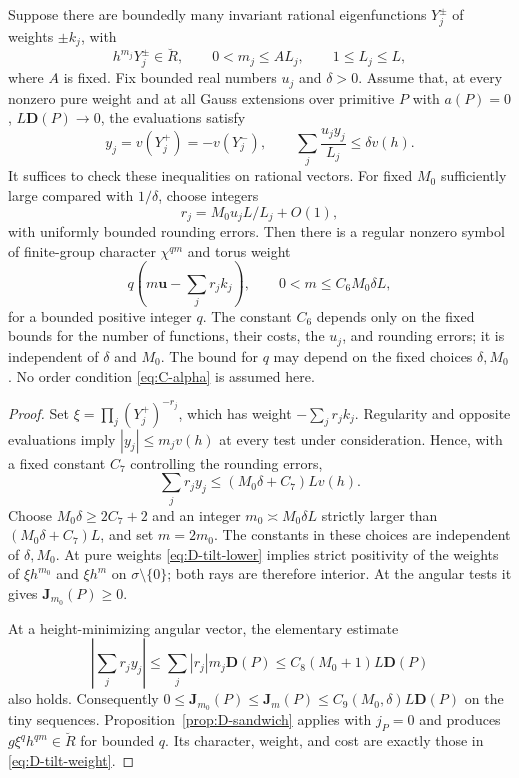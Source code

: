 \begin{corollary}
\label{cor:D-tilted-characters}
Suppose there are boundedly many invariant rational eigenfunctions
$Y_j^\pm$ of weights $\pm k_j$, with
\[
 h^{m_j}Y_j^\pm\in\breve R,\qquad
 0<m_j\le A L_j,\qquad 1\le L_j\le L,
\]
where $A$ is fixed.  Fix bounded real numbers $u_j$ and $\delta>0$.
Assume that, at every nonzero pure weight and at all Gauss extensions
over primitive $P$ with $a(P)=0$, $L\mathbf D(P)\to0$, the evaluations
satisfy
\begin{equation}\label{eq:D-tilt-hypothesis}
 y_j=v(Y_j^+)=-v(Y_j^-),\qquad
 \sum_j\frac{u_jy_j}{L_j}\le\delta v(h).
\end{equation}
It suffices to check these inequalities on rational vectors.  For
fixed $M_0$ sufficiently large compared with $1/\delta$, choose integers
\[
 r_j=M_0u_jL/L_j+O(1),
\]
with uniformly bounded rounding errors.  Then there is a regular
nonzero symbol of finite-group character $\chi^{qm}$ and torus weight
\begin{equation}\label{eq:D-tilt-weight}
 q\left(m\mathbf u-\sum_jr_jk_j\right),
 \qquad 0<m\le C_6M_0\delta L,
\end{equation}
for a bounded positive integer $q$.  The constant $C_6$ depends only on
the fixed bounds for the number of functions, their costs, the $u_j$,
and rounding errors; it is independent of $\delta$ and $M_0$.
The bound for $q$ may depend on the fixed choices $\delta,M_0$.
No order condition \eqref{eq:C-alpha} is assumed here.
\end{corollary}

\begin{proof}
Set $\xi=\prod_j(Y_j^+)^{-r_j}$, which has weight
$-\sum_jr_jk_j$.  Regularity and opposite evaluations imply
$|y_j|\le m_jv(h)$ at every test under consideration.  Hence, with a
fixed constant $C_7$ controlling the rounding errors,
\begin{equation}\label{eq:D-tilt-lower}
 \sum_jr_jy_j
 \le(M_0\delta+C_7)Lv(h).
\end{equation}
Choose $M_0\delta\ge2C_7+2$ and an integer
$m_0\asymp M_0\delta L$ strictly larger than
$(M_0\delta+C_7)L$, and set $m=2m_0$.  The constants in these choices
are independent of $\delta,M_0$.  At pure weights
\eqref{eq:D-tilt-lower} implies strict positivity of the weights of
$\xi h^{m_0}$ and $\xi h^m$ on $\sigma\setminus\{0\}$; both rays
are therefore interior.  At the angular tests it gives
$\mathbf J_{m_0}(P)\ge0$.

At a height-minimizing angular vector, the elementary estimate
\[
 \left|\sum_jr_jy_j\right|
 \le\sum_j|r_j|m_j\mathbf D(P)
 \le C_8(M_0+1)L\mathbf D(P)
\]
also holds.  Consequently
$0\le\mathbf J_{m_0}(P)\le\mathbf J_m(P)
\le C_9(M_0,\delta)L\mathbf D(P)$ on the tiny sequences.
Proposition~\ref{prop:D-sandwich} applies with $j_P=0$ and produces
$g\xi^qh^{qm}\in\breve R$ for bounded $q$.  Its character, weight,
and cost are exactly those in \eqref{eq:D-tilt-weight}.
\end{proof}

